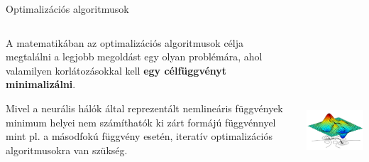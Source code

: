 \documentclass[english, aspectratio=169]{beamer}
\begin{document}
\begin{frame}{Optimalizációs algoritmusok}
\begin{columns}
\begin{column}{.5\textwidth}
A matematikában az optimalizációs algoritmusok célja megtalálni a legjobb megoldást egy olyan problémára, ahol valamilyen korlátozásokkal kell \textbf{egy célfüggvényt minimalizálni}.\par\smallskip
Mivel a neurális hálók által reprezentált nemlineáris függvények minimum helyei nem számíthatók ki zárt formájú függvénnyel mint pl. a másodfokú függvény esetén, iteratív optimalizációs algoritmusokra van szükség. 
\end{column}
\begin{column}{.5\textwidth}
\begin{center}
\includegraphics[height=7cm, width=7cm, keepaspectratio]{images/dl_8.png}
\end{center}
\end{column}
\end{columns}
\end{frame}
\end{document}

